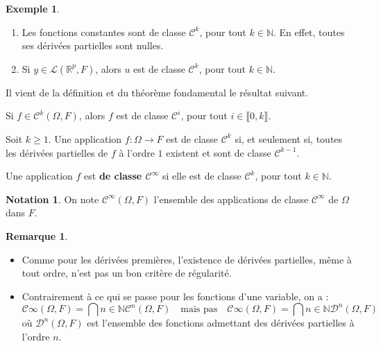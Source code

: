 \documentclass[french]{article}
\newcommand{\N}{\mathbb{N}}
\newcommand{\R}{\mathbb{R}}
\theoremstyle{plain}
\theoremstyle{definition}
\newtheorem*{ex}{Exemple}
\newtheorem*{rmq}{Remarque}
\newtheorem*{notation}{Notation}
\theoremstyle{remark}
\begin{document}
\begin{ex}
	\begin{enumerate}
		\item Les fonctions constantes sont de classe $\mathcal{C}^k$, pour tout $k\in\N$. En effet, toutes ses dérivées partielles sont nulles.
		\item Si $y\in\mathcal{L}(\R^p,F)$, alors $u$ est de classe $\mathcal{C}^k$, pour tout $k\in\N$.
	\end{enumerate}
\end{ex}

Il vient de la définition et du théorème fondamental le résultat suivant.

\begin{prop}%
	Si $f\in\mathcal{C}^k(\Omega,F)$, alors $f$ est de classe $\mathcal{C}^i$, pour tout $i\in\llbracket0,k\rrbracket$.
\end{prop}

\begin{cor}%
	Soit $k\geqslant 1$. Une application $f:\Omega\to F$ est de classe $\mathcal{C}^k$ si, et seulement si, toutes les dérivées partielles de $f$ à l'ordre $1$ existent et sont de classe $\mathcal{C}^{k-1}$.
\end{cor}

\begin{dfn}
	Une application $f$ est \textbf{de classe $\mathcal{C}^\infty$} si elle est de classe $\mathcal{C}^k$, pour tout $k\in\N$.
\end{dfn}

\begin{notation}
	On note $\mathcal{C}^\infty(\Omega,F)$ l'ensemble des applications de classe $\mathcal{C}^\infty$ de $\Omega$ dans $F$.
\end{notation}

\begin{rmq}
	\begin{itemize}
		\item Comme pour les dérivées premières, l'existence de dérivées partielles, même à tout ordre, n'est pas un bon critère de régularité.
		\item Contrairement à ce qui se passe pour les fonctions d'une variable, on a :
		$$\mathcal{C}\infty(\Omega,F)=\bigcap{n\in\N}\mathcal{C}^n(\Omega,F)\quad\text{mais pas}\quad \mathcal{C}\infty(\Omega,F)=\bigcap{n\in\N}\mathcal{D}^n(\Omega,F)$$ où $\mathcal{D}^n(\Omega,F)$ est l'ensemble des fonctions admettant des dérivées partielles à l'ordre $n$.
	\end{itemize}
\end{rmq}
\end{document}
